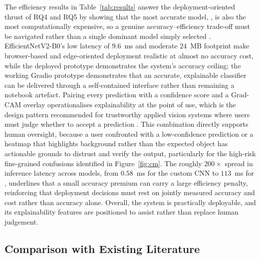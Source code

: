 The efficiency results in Table~\ref{tab:results} answer the deployment-oriented thrust of RQ4 and RQ5 by showing that the most accurate model, \bestModel{}, is also the most computationally expensive, so a genuine accuracy--efficiency trade-off must be navigated rather than a single dominant model simply selected \citep{isong2025lightweight}.
EfficientNetV2-B0's low latency of $9.6$~ms and moderate $24$~MB footprint make browser-based and edge-oriented deployment realistic at almost no accuracy cost, while the deployed \bestModel{} prototype demonstrates the system's accuracy ceiling; the working Gradio prototype demonstrates that an accurate, explainable classifier can be delivered through a self-contained interface rather than remaining a notebook artefact.
Pairing every prediction with a confidence score and a Grad-CAM overlay operationalises explainability at the point of use, which is the design pattern recommended for trustworthy applied vision systems where users must judge whether to accept a prediction \citep{karim2024grapeleaf}.
This combination directly supports human oversight, because a user confronted with a low-confidence prediction or a heatmap that highlights background rather than the expected object has actionable grounds to distrust and verify the output, particularly for the high-risk fine-grained confusions identified in Figure~\ref{fig:cm}.
The roughly $200\times$ spread in inference latency across models, from $0.58$~ms for the custom CNN to $113$~ms for \bestModel{}, underlines that a small accuracy premium can carry a large efficiency penalty, reinforcing that deployment decisions must rest on jointly measured accuracy and cost rather than accuracy alone.
Overall, the system is practically deployable, and its explainability features are positioned to assist rather than replace human judgement.

\subsection{Comparison with Existing Literature}
\label{subsec:disc-litcompare}

